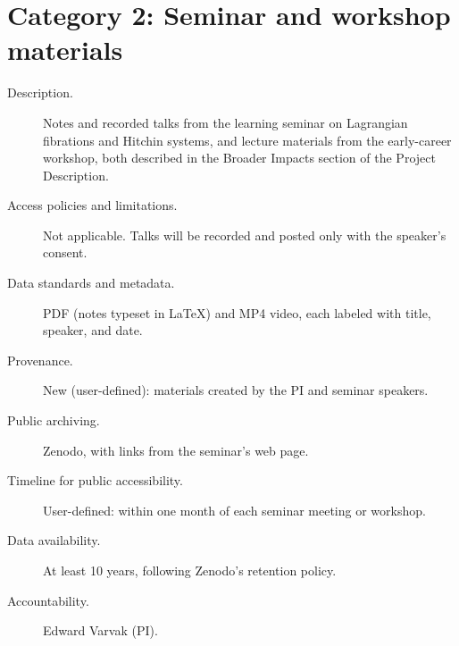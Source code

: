 \documentclass[11pt]{article}
\begin{document}
\section*{Category 2: Seminar and workshop materials}

\begin{description}
  \item[Description.] Notes and recorded talks from the learning seminar on Lagrangian
  fibrations and Hitchin systems, and lecture materials from the early-career workshop,
  both described in the Broader Impacts section of the Project Description.
  \item[Access policies and limitations.] Not applicable. Talks will be recorded and posted
  only with the speaker's consent.
  \item[Data standards and metadata.] PDF (notes typeset in \LaTeX) and MP4 video, each
  labeled with title, speaker, and date.
  \item[Provenance.] New (user-defined): materials created by the PI and seminar speakers.
  \item[Public archiving.] Zenodo, with links from the seminar's web page.
  \item[Timeline for public accessibility.] User-defined: within one month of each seminar
  meeting or workshop.
  \item[Data availability.] At least 10 years, following Zenodo's retention policy.
  \item[Accountability.] Edward Varvak (PI).
\end{description}
\end{document}
